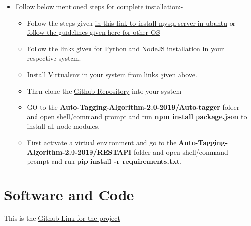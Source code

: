 \documentclass[a4paper,12pt,oneside]{book}
\begin{document}
\begin{itemize}
  \item Follow below mentioned steps for complete installation:- \begin{itemize}
      \item Follow the steps given \href{https://linuxize.com/post/how-to-install-mysql-on-ubuntu-18-04/}{in this link to install mysql server in ubuntu} or \href{https://dev.mysql.com/downloads/}{follow the guidelines given here for other OS}
      \item Follow the links given for Python and NodeJS installation in your respective system.
      \item Install Virtualenv in your system from links given above.
      \item Then clone the \href{https://github.com/eyantra-eysip/Auto-Tagging-Algorithm-2.0-2019}{Github Repository} into your system
      \item GO to the \textbf{Auto-Tagging-Algorithm-2.0-2019/Auto-tagger} folder  and open shell/command prompt and run \textbf{npm install package.json} to install all node modules.
      \item First activate a virtual environment and go to the \textbf{Auto-Tagging-Algorithm-2.0-2019/RESTAPI} folder and open shell/command prompt and run \textbf{pip install -r requirements.txt}.
  \end{itemize}
\end{itemize}


\section{Software and Code}
This is the 
\href{https://github.com/eyantra-eysip/Auto-Tagging-Algorithm-2.0-2019}{Github Link for the project}
\end{document}
